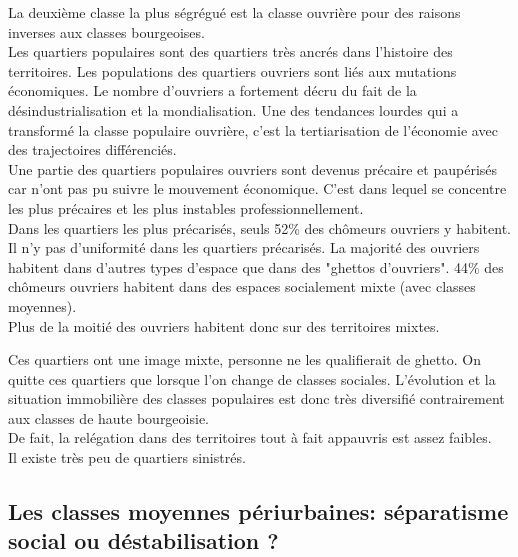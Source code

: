 \documentclass[10pt, a4paper, openany]{book}
\begin{document}
La deuxième classe la plus ségrégué est la classe ouvrière pour des raisons inverses aux classes bourgeoises. \\
Les quartiers populaires sont des quartiers très ancrés dans l'histoire des territoires. Les populations des quartiers ouvriers sont liés aux mutations économiques. Le nombre d'ouvriers a fortement décru du fait de la désindustrialisation et la mondialisation. Une des tendances lourdes qui a transformé la classe populaire ouvrière, c'est la tertiarisation de l'économie avec des trajectoires différenciés. \\
Une partie des quartiers populaires ouvriers sont devenus précaire et paupérisés car n'ont pas pu suivre le mouvement économique. C'est dans lequel se concentre les plus précaires et les plus instables professionnellement. \\
Dans les quartiers les plus précarisés, seuls 52\% des chômeurs ouvriers y habitent. Il n'y pas d'uniformité dans les quartiers précarisés. La majorité des ouvriers habitent dans d'autres types d'espace que dans des "ghettos d'ouvriers". 44\% des chômeurs ouvriers habitent dans des espaces socialement mixte (avec classes moyennes). \\
Plus de la moitié des ouvriers habitent donc sur des territoires mixtes.


Ces quartiers ont une image mixte, personne ne les qualifierait de ghetto. On quitte ces quartiers que lorsque l'on change de classes sociales. L'évolution et la situation immobilière des classes populaires est donc très diversifié contrairement aux classes de haute bourgeoisie. \\
De fait, la relégation dans des territoires tout à fait appauvris est assez faibles. \\
Il existe très peu de quartiers sinistrés.

\subsection{Les classes moyennes périurbaines: séparatisme social ou déstabilisation ?}
\end{document}
